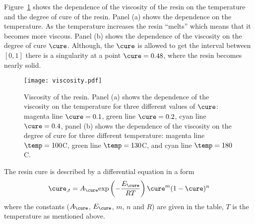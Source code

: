 \documentclass[twoside,a4paper,12pt]{article}
\newcommand{\figref}[1]{Figure~\ref{#1}}
\begin{document}
\figref{fig:viscos} shows the dependence of the viscosity of the resin
on the temperature and the degree of cure of the resin. Panel (a)
shows the dependence on the temperature. As the temperature increases
the resin ``melts'' which means that it becomes more viscous. Panel
(b) shows the dependence of the viscosity on the degree of cure
$\cure$. Although, the $\cure$ is allowed to get the interval between
$[0,1]$ there is a singularity at a point $\cure = 0.48$, where the
resin becomes nearly solid.

\begin{figure}
  \centering
  \texttt{[image: viscosity.pdf]}
  \caption{Viscosity of the resin. Panel (a) shows the dependence of the
    viscosity on the temperature for three different values of
    $\cure$: magenta line $\cure=0.1$, green line $\cure=0.2$, cyan
    line $\cure=0.4$, panel (b) shows the dependence of the viscosity
    on the degree of cure for three different temperature: magenta
    line $\temp = 100$\degree C, green line $\temp = 130$\degree C, and cyan line
    $\temp = 180$\degree C.}
  \label{fig:viscos}
\end{figure}



The resin cure is described by a differential equation in a form
%
\begin{align}
  \cure_{,t} =  A_\cure \exp{-\frac{E_\cure }{RT}} \cure^m (1-\cure)^n \label{eq:cure}
\end{align}
%
where the constants ($A_\cure$, $E_\cure$, $m$, $n$ and $R$) are
given in the table, $T$ is the temperature as mentioned above.
\end{document}
